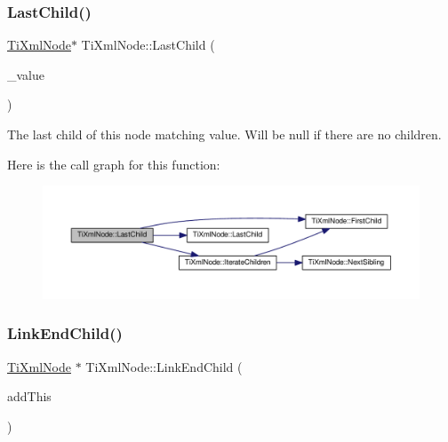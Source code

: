 \subsubsection{\texorpdfstring{Last\+Child()}{LastChild()}\hspace{0.1cm}{\footnotesize\ttfamily [4/4]}}
{\footnotesize\ttfamily \hyperlink{class_ti_xml_node}{Ti\+Xml\+Node}$\ast$ Ti\+Xml\+Node\+::\+Last\+Child (\begin{DoxyParamCaption}\item[{const char $\ast$}]{\+\_\+value }\end{DoxyParamCaption})\hspace{0.3cm}{\ttfamily [inline]}}



The last child of this node matching \textquotesingle{}value\textquotesingle{}. Will be null if there are no children. 

Here is the call graph for this function\+:
\nopagebreak
\begin{figure}[H]
\begin{center}
\leavevmode
\includegraphics[width=350pt]{class_ti_xml_node_abad5bf1059c48127b958711ef89e8e5d_cgraph}
\end{center}
\end{figure}
\mbox{\label{class_ti_xml_node_a1a881212554b759865f6cac79a851d38}} 
\subsubsection{\texorpdfstring{Link\+End\+Child()}{LinkEndChild()}}
{\footnotesize\ttfamily \hyperlink{class_ti_xml_node}{Ti\+Xml\+Node} $\ast$ Ti\+Xml\+Node\+::\+Link\+End\+Child (\begin{DoxyParamCaption}\item[{\hyperlink{class_ti_xml_node}{Ti\+Xml\+Node} $\ast$}]{add\+This }\end{DoxyParamCaption})}

